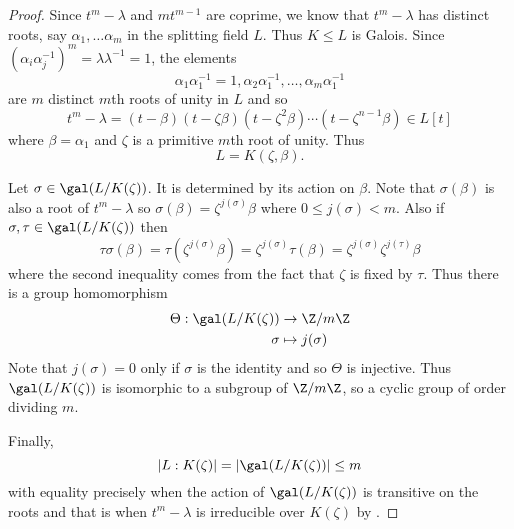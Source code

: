\documentclass[a4paper]{article}
\begin{document}
\begin{proof}
  Since \(t^m - \lambda\) and \(mt^{m - 1}\) are coprime, we know that \(t^m - \lambda\) has distinct roots, say \(\alpha_1, \dots \alpha_m\) in the splitting field \(L\). Thus \(K \leq L\) is Galois. Since \((\alpha_i\alpha_j^{-1})^m = \lambda \lambda^{-1} = 1\), the elements
  \[
    \alpha_1\alpha_1^{-1} = 1, \alpha_2\alpha_1^{-1}, \dots, \alpha_m\alpha_1^{-1}
  \]
  are \(m\) distinct \(m\)th roots of unity in \(L\) and so
  \[
    t^m - \lambda = (t - \beta)(t - \zeta\beta)(t - \zeta^2\beta) \cdots (t - \zeta^{n - 1}\beta) \in L[t]
  \]
  where \(\beta = \alpha_1\) and \(\zeta\) is a primitive \(m\)th root of unity. Thus
  \[
    L = K(\zeta, \beta).
  \]

  Let \(\sigma \in \gal(L/K(\zeta))\). It is determined by its action on \(\beta\). Note that \(\sigma(\beta)\) is also a root of \(t^m - \lambda\) so \(\sigma(\beta) = \zeta^{j(\sigma)}\beta\) where \(0 \leq j(\sigma) < m\). Also if \(\sigma, \tau \in \gal(L/K(\zeta))\) then
  \[
    \tau\sigma(\beta) = \tau(\zeta^{j(\sigma)}\beta) = \zeta^{j(\sigma)}\tau(\beta) = \zeta^{j(\sigma)}\zeta^{j(\tau)}\beta
  \]
  where the second inequality comes from the fact that \(\zeta\) is fixed by \(\tau\). Thus there is a group homomorphism
  \begin{align*}
    \Theta: \gal(L/K(\zeta)) &\to \Z/m\Z \\
    \sigma &\mapsto j(\sigma)
  \end{align*}
  Note that \(j(\sigma) = 0\) only if \(\sigma\) is the identity and so \(\Theta\) is injective. Thus \(\gal(L/K(\zeta))\) is isomorphic to a subgroup of \(\Z/m\Z\), so a cyclic group of order dividing \(m\).

  Finally,
  \[
    |L:K(\zeta)| = |\gal(L/K(\zeta))| \leq m
  \]
  with equality precisely when the action of \(\gal(L/K(\zeta))\) is transitive on the roots and that is when \(t^m - \lambda\) is irreducible over \(K(\zeta)\) by .
\end{proof}
\end{document}
